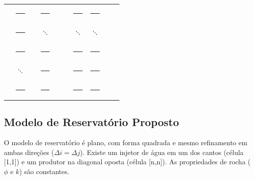 \documentclass[final,5p]{elsarticle}
\numberwithin{equation}{section}
\begin{document}
\begin{table}
\begin{tabular}{|cccccccccc|}
                \textcolor{white}{\rule{0.5em}{0.5em}} & \textcolor{white}{\rule{0.5em}{0.5em}} & \textcolor{gray}{\rule{0.5em}{0.5em}}  & \textcolor{white}{\rule{0.5em}{0.5em}} & \textcolor{black}{\rule{0.5em}{0.5em}} & \textcolor{black}{\rule{0.5em}{0.5em}} & \textcolor{gray}{\rule{0.5em}{0.5em}}  & \textcolor{white}{\rule{0.5em}{0.5em}} & \textcolor{white}{\rule{0.5em}{0.5em}} & \textcolor{white}{\rule{0.5em}{0.5em}}  \\
                \textcolor{gray}{\rule{0.5em}{0.5em}}  & \textcolor{white}{\rule{0.5em}{0.5em}} & \textcolor{white}{\rule{0.5em}{0.5em}} & $\ddots$                               & \textcolor{white}{\rule{0.5em}{0.5em}} & \textcolor{white}{\rule{0.5em}{0.5em}} & $\ddots$                               & $\ddots$                               & \textcolor{white}{\rule{0.5em}{0.5em}} & \textcolor{white}{\rule{0.5em}{0.5em}}  \\
                \textcolor{gray}{\rule{0.5em}{0.5em}}  & \textcolor{white}{\rule{0.5em}{0.5em}} & \textcolor{white}{\rule{0.5em}{0.5em}} & \textcolor{white}{\rule{0.5em}{0.5em}} & \textcolor{white}{\rule{0.5em}{0.5em}} & \textcolor{white}{\rule{0.5em}{0.5em}} & \textcolor{white}{\rule{0.5em}{0.5em}} & \textcolor{white}{\rule{0.5em}{0.5em}} & \textcolor{white}{\rule{0.5em}{0.5em}} & \textcolor{white}{\rule{0.5em}{0.5em}}  \\
                \textcolor{white}{\rule{0.5em}{0.5em}} & $\ddots$                               & \textcolor{white}{\rule{0.5em}{0.5em}} & \textcolor{white}{\rule{0.5em}{0.5em}} & \textcolor{white}{\rule{0.5em}{0.5em}} & \textcolor{white}{\rule{0.5em}{0.5em}} & \textcolor{gray}{\rule{0.5em}{0.5em}}  & \textcolor{white}{\rule{0.5em}{0.5em}} & \textcolor{black}{\rule{0.5em}{0.5em}} & \textcolor{black}{\rule{0.5em}{0.5em}}  \\
                \textcolor{white}{\rule{0.5em}{0.5em}} & \textcolor{white}{\rule{0.5em}{0.5em}} & \textcolor{white}{\rule{0.5em}{0.5em}} & \textcolor{white}{\rule{0.5em}{0.5em}} & \textcolor{white}{\rule{0.5em}{0.5em}} & \textcolor{white}{\rule{0.5em}{0.5em}} & \textcolor{gray}{\rule{0.5em}{0.5em}}  & \textcolor{white}{\rule{0.5em}{0.5em}} & \textcolor{black}{\rule{0.5em}{0.5em}} & \textcolor{black}{\rule{0.5em}{0.5em}}  \\
            \end{tabular}
        \end{table}

        \subsection{Modelo de Reservatório Proposto}
            O modelo de reservatório é plano, com forma quadrada e mesmo refinamento em ambas direções ($\Delta i = \Delta j$). Existe um injetor de água em um dos cantos (célula [1,1]) e um produtor na diagonal oposta (célula [n,n]). As propriedades de rocha ($\phi$ e $k$) são constantes.
\end{document}
